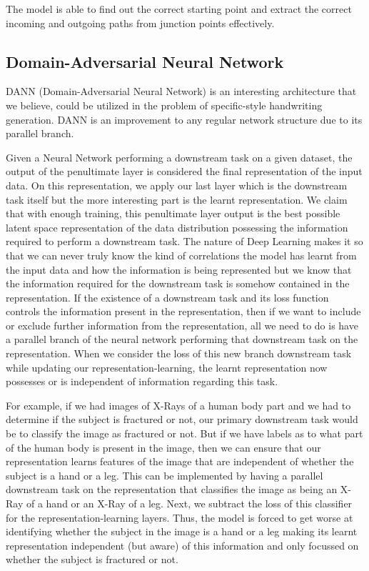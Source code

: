 \documentclass[10pt,twocolumn,letterpaper]{article}
\begin{document}
The model is able to find out the correct starting point and extract the correct incoming and outgoing paths from junction points effectively. 


\subsection{Domain-Adversarial Neural Network\cite{DANN}}
\label{subsec: DANN}

DANN (Domain-Adversarial Neural Network) \cite{DANN} is an interesting architecture that we believe, could be utilized in the problem of specific-style handwriting generation. DANN is an improvement to any regular network structure due to its parallel branch.

Given a Neural Network performing a downstream task on a given dataset, the output of the penultimate layer is considered the final representation of the input data. On this representation, we apply our last layer which is the downstream task itself but the more interesting part is the learnt representation. We claim that with enough training, this penultimate layer output is the best possible latent space representation of the data distribution possessing the information required to perform a downstream task. The nature of Deep Learning makes it so that we can never truly know the kind of correlations the model has learnt from the input data and how the information is being represented but we know that the information required for the downstream task is somehow contained in the representation. If the existence of a downstream task and its loss function controls the information present in the representation, then if we want to include or exclude further information from the representation, all we need to do is have a parallel branch of the neural network performing that downstream task on the representation. When we consider the loss of this new branch downstream task while updating our representation-learning, the learnt representation now possesses or is independent of information regarding this task.

For example, if we had images of X-Rays of a human body part and we had to determine if the subject is fractured or not, our primary downstream task would be to classify the image as fractured or not. But if we have labels as to what part of the human body is present in the image, then we can ensure that our representation learns features of the image that are independent of whether the subject is a hand or a leg. This can be implemented by having a parallel downstream task on the representation that classifies the image as being an X-Ray of a hand or an X-Ray of a leg. Next, we subtract the loss of this classifier for the representation-learning layers. Thus, the model is forced to get worse at identifying whether the subject in the image is a hand or a leg making its learnt representation independent (but aware) of this information and only focussed on whether the subject is fractured or not.
\end{document}
